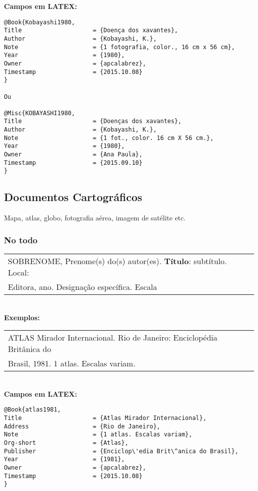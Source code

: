 \textbf{Campos em LATEX:} 

\begin{verbatim}
@Book{Kobayashi1980,
Title                    = {Doença dos xavantes},
Author                   = {Kobayashi, K.},
Note                     = {1 fotografia, color., 16 cm x 56 cm},
Year                     = {1980},
Owner                    = {apcalabrez},
Timestamp                = {2015.10.08}
}

Ou

@Misc{KOBAYASHI1980,
Title                    = {Doenças dos xavantes},
Author                   = {Kobayashi, K.},
Note                     = {1 fot., color. 16 cm X 56 cm.},
Year                     = {1980},
Owner                    = {Ana Paula},
Timestamp                = {2015.09.10}
}
\end{verbatim}


\subsection{Documentos Cartogr\'aficos}

Mapa, atlas, globo, fotografia a\'erea, imagem de sat\'elite etc. 
\subsubsection{No todo}

\begin{tabular}{|l|c|} \hline
	SOBRENOME, Prenome(s) do(s) autor(es). \textbf{Título}: subtítulo. Local: \\
	Editora, ano. Designação específica. Escala
	\\\hline
\end{tabular} \\

\textbf{Exemplos:} \\

\begin{tabular}{|l|c|} \hline
	ATLAS Mirador Internacional. Rio de Janeiro: Enciclop\'edia Brit\^anica do\\
	Brasil, 1981. 1 atlas. Escalas variam. 
	\\\hline
\end{tabular} \\

\textbf{Campos em LATEX:} 

\begin{verbatim}
@Book{atlas1981,
Title                    = {Atlas Mirador Internacional},
Address                  = {Rio de Janeiro},
Note                     = {1 atlas. Escalas variam},
Org-short                = {Atlas},
Publisher                = {Enciclop\'edia Brit\^anica do Brasil},
Year                     = {1981},
Owner                    = {apcalabrez},
Timestamp                = {2015.10.08}
}
\end{verbatim}

